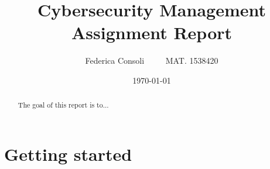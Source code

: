 \documentclass[a4paper]{article}
\title{%
	Cybersecurity Management\\
	\large Assignment Report}
\author{Federica Consoli $\; \; \; \; \; \; \;$ MAT. 1538420}
\date{\today}
\begin{document}
	\maketitle
	\newpage
	\begin{abstract}
		The goal of this report is to...
	\end{abstract}

	\section{Getting started}
	
\end{document}
